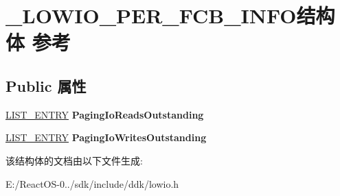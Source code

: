 \hypertarget{struct___l_o_w_i_o___p_e_r___f_c_b___i_n_f_o}{}\section{\+\_\+\+L\+O\+W\+I\+O\+\_\+\+P\+E\+R\+\_\+\+F\+C\+B\+\_\+\+I\+N\+F\+O结构体 参考}
\label{struct___l_o_w_i_o___p_e_r___f_c_b___i_n_f_o}
\subsection*{Public 属性}
\begin{DoxyCompactItemize}
\item 
\mbox{\label{struct___l_o_w_i_o___p_e_r___f_c_b___i_n_f_o_a238e496a83e6a98ab9aa97dc053bcc7c}} 
\hyperlink{struct___l_i_s_t___e_n_t_r_y}{L\+I\+S\+T\+\_\+\+E\+N\+T\+RY} {\bfseries Paging\+Io\+Reads\+Outstanding}
\item 
\mbox{\label{struct___l_o_w_i_o___p_e_r___f_c_b___i_n_f_o_a6fce6ce3a53073eb5518fc2e840480c0}} 
\hyperlink{struct___l_i_s_t___e_n_t_r_y}{L\+I\+S\+T\+\_\+\+E\+N\+T\+RY} {\bfseries Paging\+Io\+Writes\+Outstanding}
\end{DoxyCompactItemize}


该结构体的文档由以下文件生成\+:\begin{DoxyCompactItemize}
\item 
E\+:/\+React\+O\+S-\/0../sdk/include/ddk/lowio.\+h\end{DoxyCompactItemize}
